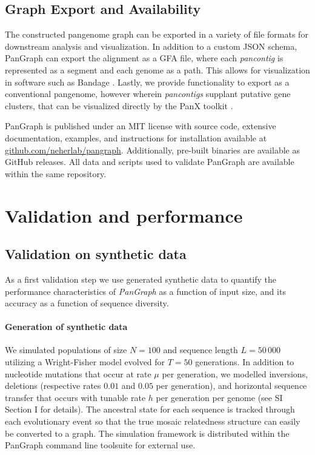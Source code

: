 \documentclass[aps,rmp,reprint,superscriptaddress,notitlepage,10pt]{revtex4-1}
\begin{document}
\subsection{Graph Export and Availability}
The constructed pangenome graph can be exported in a variety of file formats for downstream analysis and visualization.
In addition to a custom JSON schema, PanGraph can export the alignment as a GFA file, where each \emph{pancontig} is represented as a segment and each genome as a path.
This allows for visualization in software such as Bandage \cite{wick2015bandage}.
Lastly, we provide functionality to export as a conventional pangenome, however wherein \emph{pancontigs} supplant putative gene clusters, that can be visualized directly by the PanX toolkit \cite{ding2018panx}.

PanGraph is published under an MIT license with source code, extensive documentation, examples, and instructions for installation available at \url{github.com/neherlab/pangraph}.
Additionally, pre-built binaries are available as GitHub releases.
All data and scripts used to validate PanGraph are available within the same repository.

\section{Validation and performance}

\subsection{Validation on synthetic data}

As a first validation step we use generated synthetic data to quantify the performance characteristics of \textit{PanGraph} as a function of input size, and its accuracy as a function of sequence diversity.

\paragraph*{Generation of synthetic data}

We simulated populations of size $N=100$ and sequence length $L=50\,000$ utilizing a Wright-Fisher model \cite{hudson2002generating} evolved for $T=50$ generations.
In addition to nucleotide mutations that occur at rate $\mu$ per generation, we modelled inversions, deletions (respective rates $0.01$ and $0.05$ per generation), and horizontal sequence transfer that occurs with tunable rate $h$ per generation per genome (see SI Section I for details).
The ancestral state for each sequence is tracked through each evolutionary event so that the true mosaic relatedness structure can easily be converted to a graph.
The simulation framework is distributed within the PanGraph command line toolsuite for external use.
\end{document}
